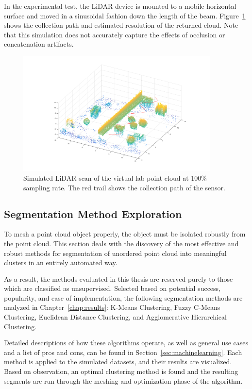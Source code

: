 \documentclass[12pt]{drexelthesis}
\let\Oldsubsection\subsection
\renewcommand{\subsection}{\FloatBarrier\Oldsubsection}
\begin{document}
In the experimental test, the LiDAR device is mounted to a mobile horizontal surface and moved in a sinusoidal fashion down the length of the beam. Figure~\ref{lidarsim:100psample} shows the collection path and estimated resolution of the returned cloud. Note that this simulation does not accurately capture the effects of occlusion or concatenation artifacts.

\begin{figure}[!ht]
	\centering
	\includegraphics[width=4in]{simulated-lab-scan/lidarSim/100psample.png}
	\caption[Simulated LiDAR scan at 100\% sampling rate]{\centering Simulated LiDAR scan of the virtual lab point cloud at 100\% sampling rate. The red trail shows the collection path of the sensor.}
	\label{lidarsim:100psample}
\end{figure}


\subsection{Segmentation Method Exploration}

To mesh a point cloud object properly, the object must be isolated robustly from the point cloud. This section deals with the discovery of the most effective and robust methods for segmentation of unordered point cloud into meaningful clusters in an entirely automated way.

As a result, the methods evaluated in this thesis are reserved purely to those which are classified as unsupervised. Selected based on potential success, popularity, and ease of implementation, the following segmentation methods are analyzed in Chapter~\ref{chap:results}: K-Means Clustering, Fuzzy C-Means Clustering, Euclidean Distance Clustering, and Agglomerative Hierarchical Clustering.

Detailed descriptions of how these algorithms operate, as well as general use cases and a list of pros and cons, can be found in Section~\ref{sec:machinelearning}. Each method is applied to the simulated datasets, and their results are visualized. Based on observation, an optimal clustering method is found and the resulting segments are run through the meshing and optimization phase of the algorithm.
\end{document}
